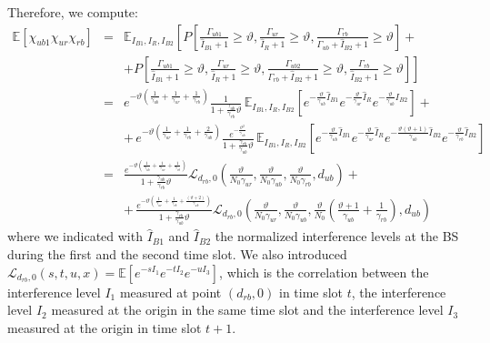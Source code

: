 \documentclass[12pt, letterpaper, onecolumn, draftcls]{IEEEtran}
\begin{document}
Therefore, we compute:
\begin{eqnarray}
 \mathbb{E}\left[\chi_{ub1}\chi_{ur}\chi_{rb}\right] & = &  \mathbb{E}_{I_{B1},I_R,I_{B2}}\left[P\left[\frac{\Gamma_{ub1}}{\hat{I}_{B1}+1}\geq\vartheta,\frac{\Gamma_{ur}}{\hat{I}_R+1}\geq\vartheta,\frac{\Gamma_{rb}}{\Gamma_{ub}+\hat{I}_{B2}+1}\geq\vartheta\right]+\right.\nonumber\\
& & + \left.P\left[\frac{\Gamma_{ub1}}{\hat{I}_{B1}+1}\geq\vartheta,\frac{\Gamma_{ur}}{\hat{I}_R+1}\geq\vartheta,\frac{\Gamma_{ub2}}{\Gamma_{rb}+\hat{I}_{B2}+1}\geq\vartheta, \frac{\Gamma_{rb}}{\hat{I}_{B2}+1}\geq\vartheta\right]\right] \nonumber\\
 & = & e^{-\vartheta\left(\frac{1}{\gamma_{ub}}+\frac{1}{\gamma_{ur}}+\frac{1}{\gamma_{rb}}\right)}\frac{1}{1+\frac{\gamma_{ub}}{\gamma_{rb}}\vartheta}\,\mathbb{E}_{I_{B1},I_R,I_{B2}}\left[e^{-\frac{\vartheta}{\gamma_{ub}}\hat{I}_{B1}}e^{-\frac{\vartheta}{\gamma_{ur}}\hat{I}_R}e^{-\frac{\vartheta}{\gamma_{ub}}\hat{I}_{B2}}\right] + \nonumber\\
 & & +\, e^{-\vartheta\left(\frac{1}{\gamma_{ur}}+\frac{1}{\gamma_{rb}}+\frac{2}{\gamma_{ub}}\right)}\frac{e^{-\frac{\vartheta^2}{\gamma_{ub}}}}{1+\frac{\gamma_{rb}}{\gamma_{ub}}\vartheta}\,\mathbb{E}_{I_{B1},I_R,I_{B2}}\left[e^{-\frac{\vartheta}{\gamma_{ub}}\hat{I}_{B1}}e^{-\frac{\vartheta}{\gamma_{ur}}\hat{I}_R}e^{-\frac{\vartheta(\vartheta+1)}{\gamma_{ub}}\hat{I}_{B2}}e^{-\frac{\vartheta}{\gamma_{rb}}\hat{I}_{B2}}\right] \nonumber \\
 & = & \frac{e^{-\vartheta\left(\frac{1}{\gamma_{ub}}+\frac{1}{\gamma_{ur}}+\frac{1}{\gamma_{rb}}\right)}}{1+\frac{\gamma_{ub}}{\gamma_{rb}}\vartheta}\mathscr{L}_{d_{rb},0}\left(\frac{\vartheta}{N_0\gamma_{ur}},\frac{\vartheta}{N_0\gamma_{ub}},\frac{\vartheta}{N_0\gamma_{rb}}, d_{ub}\right) +\nonumber\\
 & & +\, \frac{e^{-\vartheta\left(\frac{1}{\gamma_{ur}}+\frac{1}{\gamma_{rb}}+\frac{(\vartheta+2)}{\gamma_{ub}}\right)}}{1+\frac{\gamma_{rb}}{\gamma_{ub}}\vartheta}\mathscr{L}_{d_{rb},0}\left(\frac{\vartheta}{N_0\gamma_{ur}},\frac{\vartheta}{N_0\gamma_{ub}},\frac{\vartheta}{N_0}\left(\frac{\vartheta+1}{\gamma_{ub}}+\frac{1}{\gamma_{rb}}\right),d_{ub}\right)
 \label{E_ub1urrb}
\end{eqnarray}
where we indicated with $\hat{I}_{B1}$ and $\hat{I}_{B2}$ the normalized interference levels at the BS during the first and the second time slot. We also introduced $\mathscr{L}_{d_{rb},0}\left(s,t,u,x\right) = \mathbb{E}\left[e^{-sI_1}e^{-tI_2}e^{-uI_3}\right]$, which is the correlation between the interference level $I_1$ measured at point $(d_{rb},0)$ in time slot $t$, the interference level $I_2$ measured at the origin in the same time slot and the interference level $I_3$ measured at the origin in time slot $t+1$.
\end{document}
